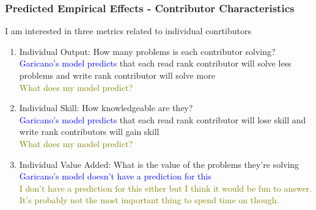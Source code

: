 \documentclass[source/paper/main.tex]{subfiles}
\begin{document}
\subsubsection{Predicted Empirical Effects - Contributor Characteristics}
I am interested in three metrics related to individual conrtibutors
\begin{enumerate}
    \item Individual Output: How many problems is each contributor solving?\\
    \textcolor{blue}{Garicano's model predicts } that each read rank contributor will solve less problems and write rank contributor will solve more\\
    \textcolor{olive}{What does my model predict?}
    \item Individual Skill: How knowledgeable are they? \\
    \textcolor{blue}{Garicano's model predicts } that each read rank contributor will lose skill and write rank contributors will gain skill\\
    \textcolor{olive}{What does my model predict?}
    \item Individual Value Added: What is the value of the problems they're solving\\
    \textcolor{blue}{Garicano's model doesn't have a prediction for this}\\
    \textcolor{olive}{I don't have a prediction for this either but I think it would be fun to answer. It's probably not the most important thing to spend time on though.}
\end{enumerate}
\end{document}
